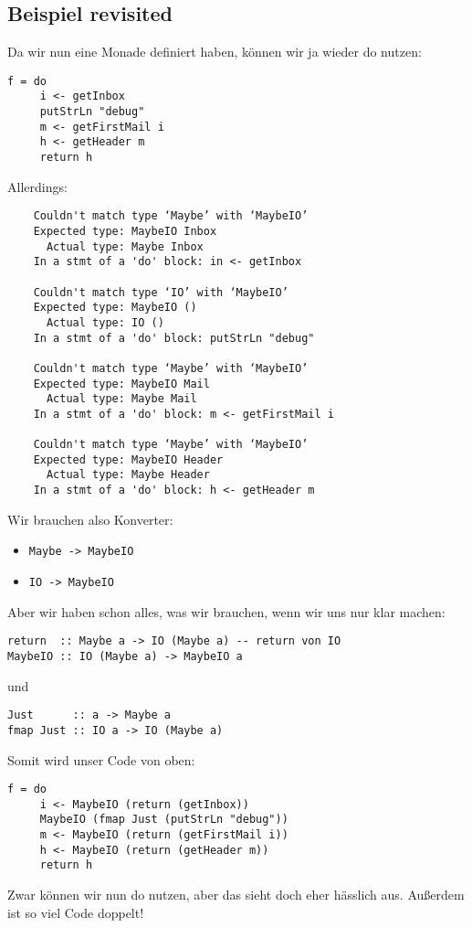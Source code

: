 \documentclass{beamer}
\begin{document}
\subsection{Beispiel revisited}
\begin{frame}[fragile]
Da wir nun eine Monade definiert haben, können wir ja wieder do nutzen:
\begin{verbatim}
f = do
     i <- getInbox
     putStrLn "debug"
     m <- getFirstMail i
     h <- getHeader m
     return h
\end{verbatim}
\end{frame}
\begin{frame}[fragile]
Allerdings:
\begin{verbatim}
    Couldn't match type ‘Maybe’ with ‘MaybeIO’
    Expected type: MaybeIO Inbox
      Actual type: Maybe Inbox
    In a stmt of a 'do' block: in <- getInbox

    Couldn't match type ‘IO’ with ‘MaybeIO’
    Expected type: MaybeIO ()
      Actual type: IO ()
    In a stmt of a 'do' block: putStrLn "debug"

    Couldn't match type ‘Maybe’ with ‘MaybeIO’
    Expected type: MaybeIO Mail
      Actual type: Maybe Mail
    In a stmt of a 'do' block: m <- getFirstMail i
    
    Couldn't match type ‘Maybe’ with ‘MaybeIO’
    Expected type: MaybeIO Header
      Actual type: Maybe Header
    In a stmt of a 'do' block: h <- getHeader m
\end{verbatim}
\end{frame}

\begin{frame}[fragile]
Wir brauchen also Konverter:
\begin{itemize}
 \item \texttt{Maybe -> MaybeIO}
 \item \texttt{IO -> MaybeIO}
\end{itemize}
\pause
Aber wir haben schon alles, was wir brauchen, wenn wir uns nur klar machen:
\begin{verbatim}
return  :: Maybe a -> IO (Maybe a) -- return von IO
MaybeIO :: IO (Maybe a) -> MaybeIO a
\end{verbatim}
\pause
und
\begin{verbatim}
Just      :: a -> Maybe a
fmap Just :: IO a -> IO (Maybe a)
\end{verbatim}
\end{frame}

\begin{frame}[fragile]
Somit wird unser Code von oben:
\begin{verbatim}
f = do
     i <- MaybeIO (return (getInbox))
     MaybeIO (fmap Just (putStrLn "debug"))
     m <- MaybeIO (return (getFirstMail i))
     h <- MaybeIO (return (getHeader m))
     return h
\end{verbatim}
\pause
Zwar können wir nun do nutzen, aber das sieht doch eher hässlich aus. Außerdem ist so viel Code doppelt!
\end{frame}
\end{document}

